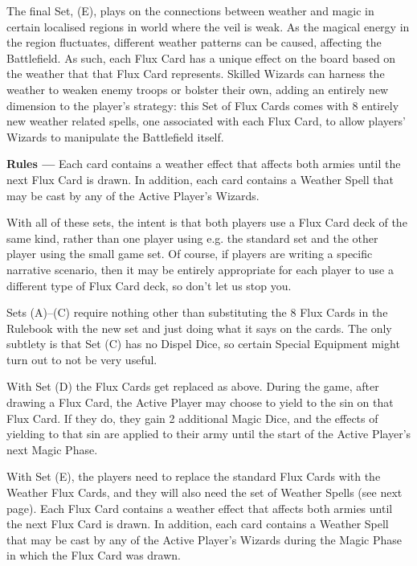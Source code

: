 The final Set, (E), plays on the connections between weather and magic in certain localised regions in \theninthage{} world where the veil is weak. As the magical energy in the region fluctuates, different weather patterns can be caused, affecting the Battlefield. As such, each Flux Card has a unique effect on the board based on the weather that that Flux Card represents. Skilled Wizards can harness the weather to weaken enemy troops or bolster their own, adding an entirely new dimension to the player's strategy: this Set of Flux Cards comes with 8 entirely new weather related spells, one associated with each Flux Card, to allow players' Wizards to manipulate the Battlefield itself.

\textbf{Rules ---} Each card contains a weather effect that affects both armies until the next Flux Card is drawn. In
addition, each card contains a Weather Spell that may be cast by any of the Active Player's Wizards.


With all of these sets, the intent is that both players use a Flux Card deck of the same kind, rather than one player using e.g. the standard set and the other player using the small game set. Of course, if players are writing a specific narrative scenario, then it may be entirely appropriate for each player to use a different type of Flux Card deck, so don't let us stop you.

Sets (A)--(C) require nothing other than substituting the 8 Flux Cards in the Rulebook with the new set and
just doing what it says on the cards. The only subtlety is that Set (C) has no Dispel Dice, so certain Special Equipment might turn out to not be very useful.

With Set (D) the Flux Cards get replaced as above. During the game, after drawing a Flux Card, the Active Player may choose to yield to the sin on that Flux Card. If they do, they gain 2 additional Magic Dice, and the effects of yielding to that sin are applied to their army until the start of the Active Player's next Magic Phase.

With Set (E), the players need to replace the standard Flux Cards with the Weather Flux Cards, and they will also need the set of Weather Spells (see next page). Each Flux Card contains a weather effect that affects both armies until the next Flux Card is drawn. In addition, each card contains a Weather Spell that may be cast by any of the Active Player's Wizards during the Magic Phase in which the Flux Card was drawn.
